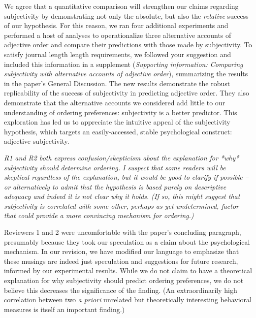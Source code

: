 \documentclass[12pt]{article}
\newcommand{\ndg}[1]{\textcolor{Green}{[ndg: #1]}}
\newcommand{\jd}[1]{\textcolor{red}{[jd: #1]}}
\begin{document}
We agree that a quantitative comparison will strengthen our claims regarding subjectivity by demonstrating not only the absolute, but also the \emph{relative} success of our hypothesis. For this reason, we ran four additional experiments and performed a host of analyses to operationalize three alternative accounts of adjective order and compare their predictions with those made by subjectivity. To satisfy journal length length requirements, we followed your suggestion and included this information in a supplement (\emph{Supporting information: Comparing subjectivity with alternative accounts of adjective order}), summarizing the results in the paper's General Discussion.
The new results demonstrate the robust replicability of the success of subjectivity in predicting adjective order. They also demonstrate that the alternative accounts we considered add little to our understanding of ordering preferences: subjectivity is a better predictor. %
This exploration has led us to appreciate the intuitive appeal of the subjectivity hypothesis, which targets an easily-accessed, stable psychological construct: adjective subjectivity.


\item \emph{R1 and R2 both express confusion/skepticism about the explanation for *why* subjectivity should determine ordering. I suspect that some readers will be skeptical regardless of the explanation, but it would be good to clarify if possible -- or alternatively to admit that the hypothesis is based purely on descriptive adequacy and indeed it is not clear why it holds. (If so, this might suggest that subjectivity is correlated with some other, perhaps as yet undetermined, factor that could provide a more convincing mechanism for ordering.)}

Reviewers 1 and 2 were uncomfortable with the paper's concluding paragraph, presumably because they took our speculation as a claim about the psychological mechanism. In our revision, we have modified our language to emphasize that these musings are indeed just speculation and suggestions for future research, informed by our experimental results. While we do not claim to have a theoretical explanation for why subjectivity should predict ordering preferences, we do not believe this decreases the significance of the finding. 
(An extraordinarily high correlation between two \emph{a priori} unrelated but theoretically interesting behavioral measures is itself an important finding.) 
\end{document}
